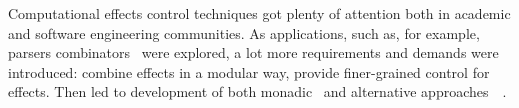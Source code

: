 Computational effects control techniques got plenty of attention both in academic and software engineering communities. As applications, such as, for example, parsers combinators~\cite{monParsing} were explored, a lot more requirements and demands
were introduced: combine effects in a modular way, provide finer-grained control
for effects. Then led to development of both monadic~\cite{Liang:1995:MTM:199448.199528} and alternative approaches~\cite{Mcbride:2008:APE:1348940.1348941}~\cite{effects}.
